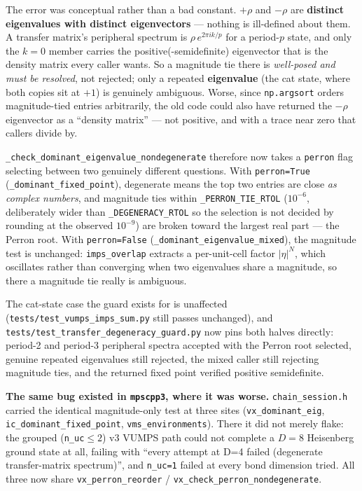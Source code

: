\documentclass[11pt]{article}
\begin{document}
The error was conceptual rather than a bad constant. $+\rho$ and $-\rho$
are \textbf{distinct eigenvalues with distinct eigenvectors} --- nothing
is ill-defined about them. A transfer matrix's peripheral spectrum is
$\rho\,e^{2\pi i k/p}$ for a period-$p$ state, and only the $k=0$ member
carries the positive(-semidefinite) eigenvector that is the density matrix
every caller wants. So a magnitude tie there is \emph{well-posed and must
be resolved}, not rejected; only a repeated \textbf{eigenvalue} (the cat
state, where both copies sit at $+1$) is genuinely ambiguous. Worse, since
\texttt{np.argsort} orders magnitude-tied entries arbitrarily, the old
code could also have returned the $-\rho$ eigenvector as a ``density
matrix'' --- not positive, and with a trace near zero that callers divide
by.

\texttt{\_check\_dominant\_eigenvalue\_nondegenerate} therefore now takes
a \texttt{perron} flag selecting between two genuinely different
questions. With \texttt{perron=True}
(\texttt{\_dominant\_fixed\_point}), degenerate means the top two entries
are close \emph{as complex numbers}, and magnitude ties within
\texttt{\_PERRON\_TIE\_RTOL} ($10^{-6}$, deliberately wider than
\texttt{\_DEGENERACY\_RTOL} so the selection is not decided by rounding at
the observed $10^{-9}$) are broken toward the largest real part --- the
Perron root. With \texttt{perron=False}
(\texttt{\_dominant\_eigenvalue\_mixed}), the magnitude test is unchanged:
\texttt{imps\_overlap} extracts a per-unit-cell factor $|\eta|^N$, which
oscillates rather than converging when two eigenvalues share a magnitude,
so there a magnitude tie really is ambiguous.

The cat-state case the guard exists for is unaffected
(\texttt{tests/test\_vumps\_imps\_sum.py} still passes unchanged), and
\texttt{tests/test\_transfer\_degeneracy\_guard.py} now pins both halves
directly: period-2 and period-3 peripheral spectra accepted with the
Perron root selected, genuine repeated eigenvalues still rejected, the
mixed caller still rejecting magnitude ties, and the returned fixed point
verified positive semidefinite.

\textbf{The same bug existed in \texttt{mpscpp3}, where it was worse.}
\texttt{chain\_session.h} carried the identical magnitude-only test at three
sites (\texttt{vx\_dominant\_eig}, \texttt{ic\_dominant\_fixed\_point},
\texttt{vms\_environments}). There it did not merely flake: the grouped
(\texttt{n\_uc}$\le 2$) v3 VUMPS path could not complete a $D=8$ Heisenberg
ground state at all, failing with ``every attempt at D=4 failed (degenerate
transfer-matrix spectrum)'', and \texttt{n\_uc=1} failed at every bond
dimension tried. All three now share \texttt{vx\_perron\_reorder} /
\texttt{vx\_check\_perron\_nondegenerate}.
\end{document}
